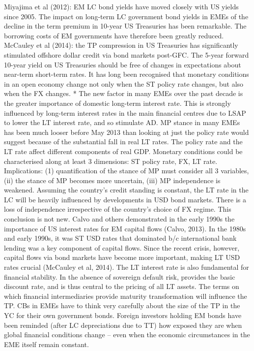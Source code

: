 Miyajima et al (2012): EM LC bond yields have moved closely with US yields since 2005.
The impact on long-term LC government bond yields in EMEs of the decline in the term premium in 10-year US Treasuries has been remarkable. The borrowing costs of EM governments have therefore been greatly reduced.
McCauley et al (2014): the TP compression in US Treasuries has significantly stimulated offshore dollar credit via bond markets post-GFC.
The 5-year forward 10-year yield on US Treasuries should be free of changes in expectations about near-term short-term rates.
It has long been recognised that monetary conditions in an open economy change
not only when the ST policy rate changes, but also when the FX changes. 
* The new factor in many EMEs over the past decade is the greater importance of
domestic long-term interest rate. This is strongly influenced by long-term interest
rates in the main financial centres due to LSAP to lower the LT interest rate, and so stimulate AD.
MP stance in many EMEs has been much looser before May 2013 than looking at just the policy rate would suggest because of the substantial fall in real LT rates. 
The policy rate and the LT rate affect different components of real GDP. 
Monetary conditions could be characterised along at least 3 dimensions: ST policy rate, FX, LT rate. Implications: (1) quantification of the stance of MP must consider all 3 variables, (ii) the stance of MP becomes more uncertain, (iii) MP independence is weakened.
Assuming the country’s credit standing is constant, the LT rate in the LC will be heavily influenced by developments in USD bond markets. There is a loss of independence irrespective of the country’s choice of FX regime. This conclusion is not new. Calvo and others demonstrated in the early 1990s the importance of US interest rates for EM capital flows (Calvo, 2013). In the 1980s and early 1990s, it was ST USD
rates that dominated b/c international bank lending was a key component of capital flows. Since the recent crisis, however, capital flows via bond markets have become more important, making LT USD rates crucial (McCauley et al, 2014). 
The LT interest rate is also fundamental for financial stability. In the absence of sovereign default risk, provides the basic discount rate, and is thus central to the pricing of all LT assets.
The terms on which financial intermediaries provide maturity transformation will influence the TP.
CBs in EMEs have to think very carefully about the size of the TP in the YC for their own government bonds.
Foreign investors holding EM bonds have been reminded (after LC depreciations due to TT) how exposed they are when global financial conditions change – even when the economic circumstances in the EME itself remain constant.


